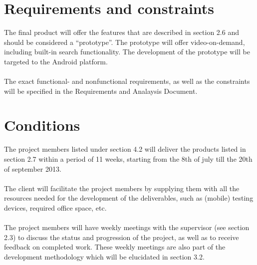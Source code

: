 \section{Requirements and constraints}
The final product will offer the features that are described in section 2.6 and should be considered a ``prototype''. The prototype will offer video-on-demand, including built-in search functionality. The development of the prototype will be targeted to the Android platform. \\
\\
The exact functional- and nonfunctional requirements, as well as the constraints will be specified in the Requirements and Analaysis Document.
\section{Conditions}
The project members listed under section 4.2 will deliver the products listed in section 2.7 within a period of 11 weeks, starting from the 8th of july till the 20th of september 2013.\\
\\
The client will facilitate the project members by supplying them with all the resources needed for the development of the deliverables, such as (mobile) testing devices, required office space, etc.\\
\\
The project members will have weekly meetings with the supervisor (see section 2.3) to discuss the status and progression of the project, as well as to receive feedback on completed work. These weekly meetings are also part of the development methodology which will be elucidated in section 3.2.